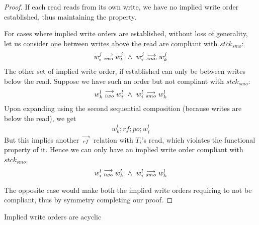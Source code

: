     \begin{proof}
        
        If each read reads from its own write, we have no implied write order established, thus maintaining the property. 

        For cases where implied write orders are established, without loss of generality, let us consider one between writes above the read are compliant with $stck{_{smo}}$:
        \begin{align}
            w_i^j\stackrel{\longrightarrow}{_{iwo}}w_k^j \ \wedge \ w_i^j\stackrel{\longrightarrow}{_{smo}}w_k^j
        \end{align}
        The other set of implied write order, if established can only be between writes below the read. Suppose we have such an order but not compliant with $stck{_{smo}}$:
        \begin{align}
            w_k^l\stackrel{\longrightarrow}{_{iwo}}w_i^l \ \wedge \ w_i^l\stackrel{\longrightarrow}{_{smo}}w_k^l
        \end{align}
        Upon expanding using the second sequential composition (because writes are below the read), we get
        \begin{align}
            w_k^l;rf;po;w_i^l 
        \end{align}
        But this implies another $\stackrel{\longrightarrow}{_{rf}}$ relation with $T_i$'s read, which violates the functional property of it. Hence we can only have an implied write order compliant with $stck{_{smo}}$.
        \begin{align}
            w_i^l\stackrel{\longrightarrow}{_{iwo}}w_k^l \ \wedge \ w_i^l\stackrel{\longrightarrow}{_{smo}}w_k^l
        \end{align}


        The opposite case would make both the implied write orders requiring to not be compliant, thus by symmetry completing our proof. 
    \end{proof}

        
    \begin{property}
        Implied write orders are acyclic
    \end{property}

